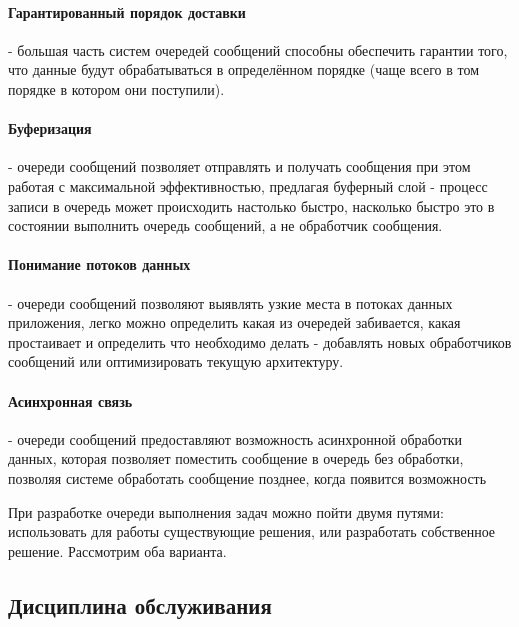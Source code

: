 \paragraph{Гарантированный порядок доставки} - большая часть систем очередей сообщений способны обеспечить гарантии того, что данные будут обрабатываться в определённом порядке (чаще всего в том порядке в котором они поступили).
\paragraph{Буферизация} - очереди сообщений позволяет отправлять и получать сообщения при этом работая с максимальной эффективностью, предлагая буферный слой - процесс записи в очередь может происходить настолько быстро, насколько быстро это в состоянии выполнить очередь сообщений, а не обработчик сообщения.
\paragraph{Понимание потоков данных} - очереди сообщений позволяют выявлять узкие места в потоках данных приложения, легко можно определить какая из очередей забивается, какая простаивает и определить что необходимо делать - добавлять новых обработчиков сообщений или оптимизировать текущую архитектуру.
\paragraph{Асинхронная связь} - очереди сообщений предоставляют возможность асинхронной обработки данных, которая позволяет поместить сообщение в очередь без обработки, позволяя системе обработать сообщение позднее, когда появится возможность

При разработке очереди выполнения задач можно пойти двумя путями: использовать для работы существующие решения, или разработать собственное решение. Рассмотрим оба варианта.


\subsection{Дисциплина обслуживания}

